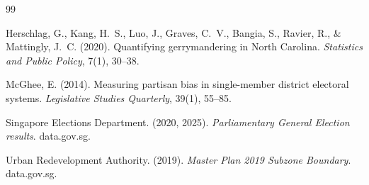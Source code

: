 \documentclass[12pt]{article}
\begin{document}
\begin{thebibliography}{99}

Herschlag, G., Kang, H.~S., Luo, J., Graves, C.~V., Bangia, S., Ravier, R.,
  \& Mattingly, J.~C. (2020).
\newblock Quantifying gerrymandering in North Carolina.
\newblock \textit{Statistics and Public Policy}, 7(1), 30--38.

McGhee, E. (2014).
\newblock Measuring partisan bias in single-member district electoral systems.
\newblock \textit{Legislative Studies Quarterly}, 39(1), 55--85.

Singapore Elections Department. (2020, 2025).
\newblock \textit{Parliamentary General Election results}.
\newblock data.gov.sg.

Urban Redevelopment Authority. (2019).
\newblock \textit{Master Plan 2019 Subzone Boundary}.
\newblock data.gov.sg.

\end{thebibliography}
\end{document}

